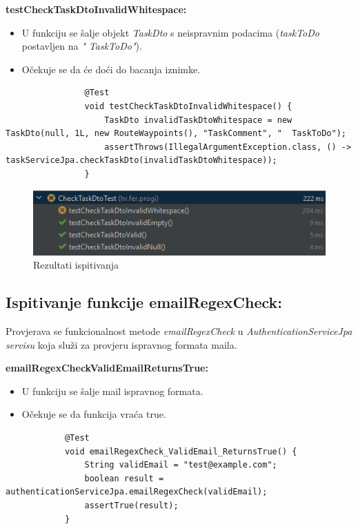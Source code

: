 			\textbf{testCheckTaskDtoInvalidWhitespace:}
			\begin{itemize}
				\item U funkciju se šalje objekt \textit{TaskDto} s neispravnim podacima (\textit{taskToDo} postavljen na \textit{"  TaskToDo"}).
				\item Očekuje se da će doći do bacanja iznimke.
			\end{itemize}
			\begin{lstlisting}
				@Test
				void testCheckTaskDtoInvalidWhitespace() {
					TaskDto invalidTaskDtoWhitespace = new TaskDto(null, 1L, new RouteWaypoints(), "TaskComment", "  TaskToDo");
					assertThrows(IllegalArgumentException.class, () -> taskServiceJpa.checkTaskDto(invalidTaskDtoWhitespace));
				}
			\end{lstlisting}
			
			\begin{figure}[H]
				\includegraphics[scale=1]{slike/checkTaskDtoTest.png} 
				\centering
				\caption{Rezultati ispitivanja}
				\label{fig:promjene}
			\end{figure}
			
			\subsection{Ispitivanje funkcije emailRegexCheck:}
			Provjerava se funkcionalnost metode \textit{emailRegexCheck} u \textit{AuthenticationServiceJpa servisu} koja služi za provjeru ispravnog formata maila.
			
			\textbf{emailRegexCheckValidEmailReturnsTrue:}
			\begin{itemize}
				\item U funkciju se šalje mail ispravnog formata.
				\item Očekuje se da funkcija vraća true.
			\end{itemize}
			\begin{lstlisting}
			@Test
			void emailRegexCheck_ValidEmail_ReturnsTrue() {
				String validEmail = "test@example.com";
				boolean result = authenticationServiceJpa.emailRegexCheck(validEmail);
				assertTrue(result);
			}
			\end{lstlisting}
			
